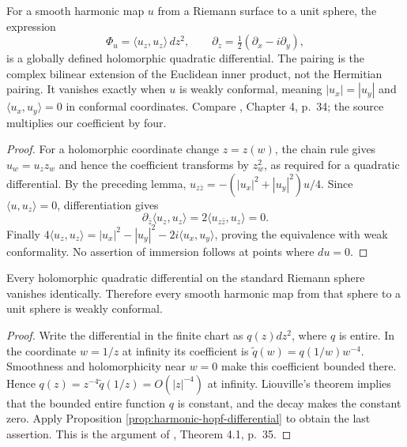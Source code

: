 \begin{proposition}\label{prop:harmonic-hopf-differential}
For a smooth harmonic map $u$ from a Riemann surface to a unit sphere, the expression
\[
 \Phi_u=\langle u_z,u_z\rangle\,dz^2,
 \qquad \partial_z=\tfrac12(\partial_x-i\partial_y),
\]
is a globally defined holomorphic quadratic differential. The pairing is the complex bilinear extension of the Euclidean inner product, not the Hermitian pairing. It vanishes exactly when $u$ is weakly conformal, meaning $|u_x|=|u_y|$ and $\langle u_x,u_y\rangle=0$ in conformal coordinates. Compare \cite{Hel01}, Chapter 4, p.~34; the source multiplies our coefficient by four.
\end{proposition}
\begin{proof}
For a holomorphic coordinate change $z=z(w)$, the chain rule gives $u_w=u_z z_w$ and hence the coefficient transforms by $z_w^2$, as required for a quadratic differential. By the preceding lemma, $u_{z\bar z}=-(|u_x|^2+|u_y|^2)u/4$. Since $\langle u,u_z\rangle=0$, differentiation gives
\[
 \partial_{\bar z}\langle u_z,u_z\rangle=2\langle u_{z\bar z},u_z\rangle=0.
\]
Finally $4\langle u_z,u_z\rangle=|u_x|^2-|u_y|^2-2i\langle u_x,u_y\rangle$, proving the equivalence with weak conformality. No assertion of immersion follows at points where $du=0$.
\end{proof}

\begin{lemma}\label{lem:sphere-quadratic-differential-zero}
Every holomorphic quadratic differential on the standard Riemann sphere vanishes identically. Therefore every smooth harmonic map from that sphere to a unit sphere is weakly conformal.
\end{lemma}
\begin{proof}
Write the differential in the finite chart as $q(z)dz^2$, where $q$ is entire. In the coordinate $w=1/z$ at infinity its coefficient is $\widetilde q(w)=q(1/w)w^{-4}$. Smoothness and holomorphicity near $w=0$ make this coefficient bounded there. Hence $q(z)=z^{-4}\widetilde q(1/z)=O(|z|^{-4})$ at infinity. Liouville's theorem implies that the bounded entire function $q$ is constant, and the decay makes the constant zero. Apply Proposition \ref{prop:harmonic-hopf-differential} to obtain the last assertion. This is the argument of \cite{Hel01}, Theorem 4.1, p.~35.
\end{proof}

